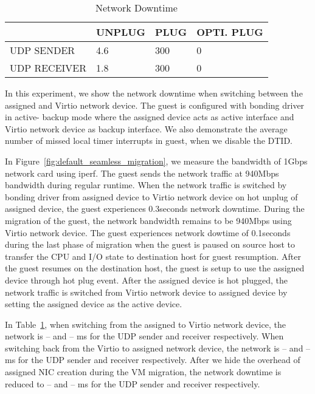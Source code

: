 

\begin{table}[tbp]
\begin{tabular}{|l|l|l|l|}
\hline
& UNPLUG & PLUG & OPTI. PLUG \\ \hline
UDP SENDER & 4.6 & 300 & 0 \\ \hline
UDP RECEIVER & 1.8 & 300 & 0 \\ \hline
\end{tabular}
\caption{Network Downtime}
\label{tab:migration_network_downtime}
\end{table}

In this experiment, we show the network downtime when
switching between the assigned and Virtio network device. 
The guest is configured with bonding driver in active-
backup mode where the assigned device acts as 
active interface and Virtio network device as 
backup interface. We also demonstrate the average 
number of missed local timer interrupts in guest, 
when we disable the DTID.

In Figure~\ref{fig:default_seamless_migration}, we measure 
the bandwidth of 1Gbps network card using iperf. 
The guest sends the network traffic at 940Mbps bandwidth 
during regular runtime. When the network traffic is 
switched by bonding driver from assigned device to 
Virtio network device on hot unplug of assigned device, 
the guest experiences 0.3seconds network downtime. 
During the migration of the guest, the network
bandwidth remains to be 940Mbps using Virtio network
device. The guest experiences network dowtime of 
0.1seconds during the last phase of migration 
when the guest is paused on source host
to transfer the CPU and I/O state to destination host
for guest resumption. After the guest resumes on the
destination host, the guest is setup to use the assigned
device through hot plug event. After the assigned device
is hot plugged, the network traffic is switched from Virtio
network device to assigned device by setting the assigned
device as the active device.


In Table~\ref{tab:migration_network_downtime}, when switching
from the assigned to Virtio network device, the network is --
and -- ms for the UDP sender and receiver respectively. When
switching back from the Virtio to assigned network device, the
network is -- and -- ms for the UDP sender and receiver
respectively. After we hide the overhead of assigned NIC
creation during the VM migration, the network downtime is
reduced to -- and -- ms for the UDP sender and receiver
respectively.

